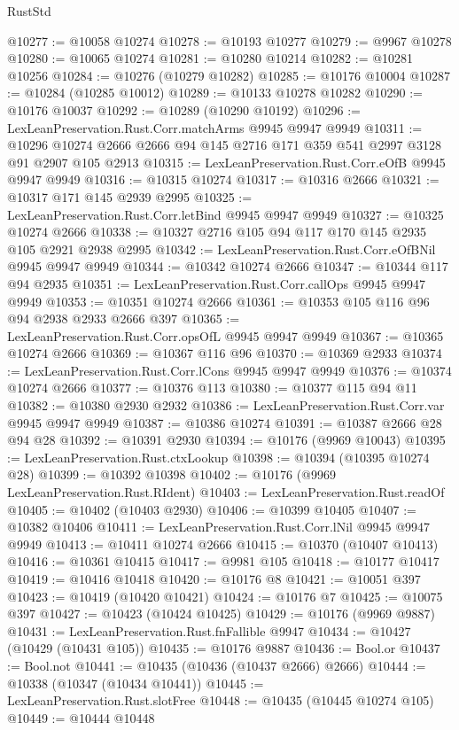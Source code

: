 \begin{lexlean}{RustStd}
\begin{coremodule}
{\begin{coremodule}
{{{{{{{{{{{{{{{{{{{{{{{{{{{{{{{{{{{{{{{{{{{{{{{{{{{{{{{{{{{{{{{{{{{{{{{{{{{{{{@10277 := @10058 @10274
@10278 := @10193 @10277
@10279 := @9967 @10278
@10280 := @10065 @10274
@10281 := @10280 @10214
@10282 := @10281 @10256
@10284 := @10276 (@10279 @10282)
@10285 := @10176 @10004
@10287 := @10284 (@10285 @10012)
@10289 := @10133 @10278 @10282
@10290 := @10176 @10037
@10292 := @10289 (@10290 @10192)
@10296 := LexLeanPreservation.Rust.Corr.matchArms @9945 @9947 @9949
@10311 := @10296 @10274 @2666 @2666 @94 @145 @2716 @171 @359 @541 @2997 @3128 @91 @2907 @105 @2913
@10315 := LexLeanPreservation.Rust.Corr.eOfB @9945 @9947 @9949
@10316 := @10315 @10274
@10317 := @10316 @2666
@10321 := @10317 @171 @145 @2939 @2995
@10325 := LexLeanPreservation.Rust.Corr.letBind @9945 @9947 @9949
@10327 := @10325 @10274 @2666
@10338 := @10327 @2716 @105 @94 @117 @170 @145 @2935 @105 @2921 @2938 @2995
@10342 := LexLeanPreservation.Rust.Corr.eOfBNil @9945 @9947 @9949
@10344 := @10342 @10274 @2666
@10347 := @10344 @117 @94 @2935
@10351 := LexLeanPreservation.Rust.Corr.callOps @9945 @9947 @9949
@10353 := @10351 @10274 @2666
@10361 := @10353 @105 @116 @96 @94 @2938 @2933 @2666 @397
@10365 := LexLeanPreservation.Rust.Corr.opsOfL @9945 @9947 @9949
@10367 := @10365 @10274 @2666
@10369 := @10367 @116 @96
@10370 := @10369 @2933
@10374 := LexLeanPreservation.Rust.Corr.lCons @9945 @9947 @9949
@10376 := @10374 @10274 @2666
@10377 := @10376 @113
@10380 := @10377 @115 @94 @11
@10382 := @10380 @2930 @2932
@10386 := LexLeanPreservation.Rust.Corr.var @9945 @9947 @9949
@10387 := @10386 @10274
@10391 := @10387 @2666 @28 @94 @28
@10392 := @10391 @2930
@10394 := @10176 (@9969 @10043)
@10395 := LexLeanPreservation.Rust.ctxLookup
@10398 := @10394 (@10395 @10274 @28)
@10399 := @10392 @10398
@10402 := @10176 (@9969 LexLeanPreservation.Rust.RIdent)
@10403 := LexLeanPreservation.Rust.readOf
@10405 := @10402 (@10403 @2930)
@10406 := @10399 @10405
@10407 := @10382 @10406
@10411 := LexLeanPreservation.Rust.Corr.lNil @9945 @9947 @9949
@10413 := @10411 @10274 @2666
@10415 := @10370 (@10407 @10413)
@10416 := @10361 @10415
@10417 := @9981 @105
@10418 := @10177 @10417
@10419 := @10416 @10418
@10420 := @10176 @8
@10421 := @10051 @397
@10423 := @10419 (@10420 @10421)
@10424 := @10176 @7
@10425 := @10075 @397
@10427 := @10423 (@10424 @10425)
@10429 := @10176 (@9969 @9887)
@10431 := LexLeanPreservation.Rust.fnFallible @9947
@10434 := @10427 (@10429 (@10431 @105))
@10435 := @10176 @9887
@10436 := Bool.or
@10437 := Bool.not
@10441 := @10435 (@10436 (@10437 @2666) @2666)
@10444 := @10338 (@10347 (@10434 @10441))
@10445 := LexLeanPreservation.Rust.slotFree
@10448 := @10435 (@10445 @10274 @105)
@10449 := @10444 @10448
}}}}}}}}}}}}}}}}}}}}}}}}}}}}}}}}}}}}}}}}}}}}}}}}}}}}}}}}}}}}}}}}}}}}}}}}}}}}}}
\end{coremodule}}
\end{coremodule}
\end{lexlean}
